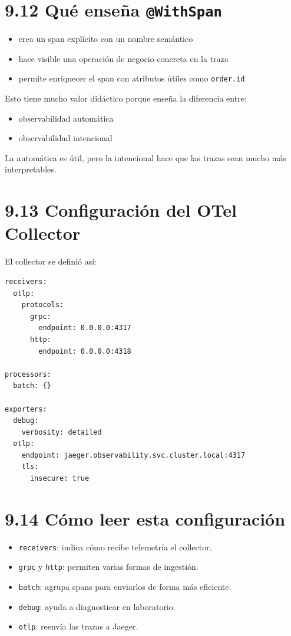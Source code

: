 \documentclass[
a4paper,
12pt]{report}
\providecommand{\tightlist}{%
  \setlength{\itemsep}{0pt}\setlength{\parskip}{0pt}}
\begin{document}
\section{\texorpdfstring{9.12 Qué enseña
\texttt{@WithSpan}}{9.12 Qué enseña @WithSpan}}\label{quuxe9-enseuxf1a-withspan}

\begin{itemize}
\tightlist
\item
  crea un span explícito con un nombre semántico
\item
  hace visible una operación de negocio concreta en la traza
\item
  permite enriquecer el span con atributos útiles como \texttt{order.id}
\end{itemize}

Esto tiene mucho valor didáctico porque enseña la diferencia entre:

\begin{itemize}
\tightlist
\item
  observabilidad automática
\item
  observabilidad intencional
\end{itemize}

La automática es útil, pero la intencional hace que las trazas sean
mucho más interpretables.

\section{9.13 Configuración del OTel
Collector}\label{configuraciuxf3n-del-otel-collector}

El collector se definió así:

\begin{verbatim}
receivers:
  otlp:
    protocols:
      grpc:
        endpoint: 0.0.0.0:4317
      http:
        endpoint: 0.0.0.0:4318

processors:
  batch: {}

exporters:
  debug:
    verbosity: detailed
  otlp:
    endpoint: jaeger.observability.svc.cluster.local:4317
    tls:
      insecure: true
\end{verbatim}

\section{9.14 Cómo leer esta
configuración}\label{cuxf3mo-leer-esta-configuraciuxf3n}

\begin{itemize}
\tightlist
\item
  \texttt{receivers}: indica cómo recibe telemetría el collector.
\item
  \texttt{grpc} y \texttt{http}: permiten varias formas de ingestión.
\item
  \texttt{batch}: agrupa spans para enviarlos de forma más eficiente.
\item
  \texttt{debug}: ayuda a diagnosticar en laboratorio.
\item
  \texttt{otlp}: reenvía las trazas a Jaeger.
\end{itemize}
\end{document}
